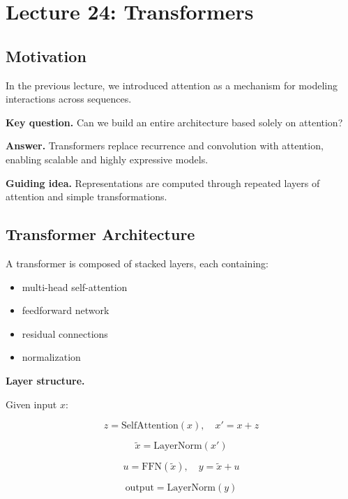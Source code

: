 \section{Lecture 24: Transformers}

\subsection{Motivation}

In the previous lecture, we introduced attention as a mechanism for modeling interactions across sequences.

\medskip

\noindent
\textbf{Key question.}  
Can we build an entire architecture based solely on attention?

\medskip

\noindent
\textbf{Answer.}  
Transformers replace recurrence and convolution with attention, enabling scalable and highly expressive models.

\medskip

\noindent
\textbf{Guiding idea.}  
Representations are computed through repeated layers of attention and simple transformations.

\subsection{Transformer Architecture}

A transformer is composed of stacked layers, each containing:

\begin{itemize}
    \item multi-head self-attention
    \item feedforward network
    \item residual connections
    \item normalization
\end{itemize}

\medskip

\noindent
\textbf{Layer structure.}

Given input $x$:

\[
z = \text{SelfAttention}(x),
\quad
x' = x + z
\]

\[
\tilde{x} = \text{LayerNorm}(x')
\]

\[
u = \text{FFN}(\tilde{x}),
\quad
y = \tilde{x} + u
\]

\[
\text{output} = \text{LayerNorm}(y)
\]

\medskip

